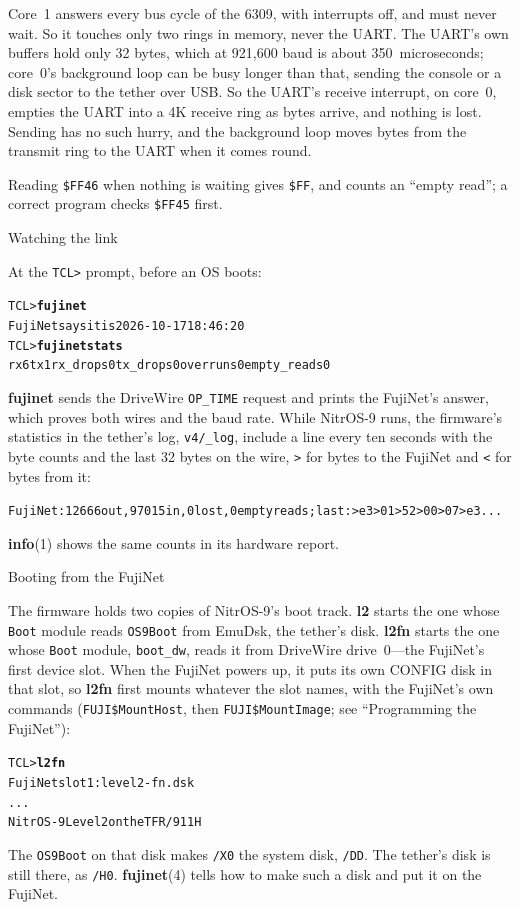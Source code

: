 \documentclass[10pt,twoside,openany]{book}
\makeatletter
\newcommand{\cmd}[1]{\textbf{#1}}            %
\newcommand{\file}[1]{\texttt{#1}}           %
\newcommand{\rp}[2]{\textbf{#1}(#2)}         %
\newenvironment{ex}{\par\vspace{0.3ex}\small\begin{alltt}}{\end{alltt}\vspace{0.3ex}}
\newenvironment{exsmall}{\par\vspace{0.3ex}\scriptsize\begin{alltt}}{\end{alltt}\vspace{0.3ex}}
\renewcommand{\subsection}{\@startsection{subsection}{2}{0pt}{2.4ex plus 0.6ex}{0.8ex}%
  {\sffamily\bfseries\normalsize}}
\makeatother
\begin{document}
Core~1 answers every bus cycle of the 6309, with interrupts off, and must
never wait. So it touches only two rings in memory, never the UART. The
UART's own buffers hold only 32 bytes, which at 921{,}600 baud is about
350~microseconds; core~0's background loop can be busy longer than that,
sending the console or a disk sector to the tether over USB. So the UART's
receive interrupt, on core~0, empties the UART into a 4K receive ring as
bytes arrive, and nothing is lost. Sending has no such hurry, and the
background loop moves bytes from the transmit ring to the UART when it
comes round.

Reading \file{\$FF46} when nothing is waiting gives \file{\$FF}, and
counts an ``empty read''; a correct program checks \file{\$FF45} first.

\subsection{Watching the link}

At the \texttt{TCL>} prompt, before an OS boots:
\begin{ex}
TCL> \textbf{fujinet}
FujiNet says it is 2026-10-17 18:46:20
TCL> \textbf{fujinet stats}
rx 6 tx 1 rx_drops 0 tx_drops 0 overruns 0 empty_reads 0
\end{ex}
\cmd{fujinet} sends the DriveWire \texttt{OP\_TIME} request and prints the
FujiNet's answer, which proves both wires and the baud rate. While NitrOS-9
runs, the firmware's statistics in the tether's log, \file{v4/\_log},
include a line every ten seconds with the byte counts and the last 32
bytes on the wire, \texttt{>} for bytes to the FujiNet and \texttt{<}
for bytes from it:
\begin{exsmall}
FujiNet: 12666 out, 97015 in, 0 lost, 0 empty reads; last: >e3 >01 >52 >00 >07 >e3 ...
\end{exsmall}
\rp{info}{1} shows the same counts in its hardware report.

\subsection{Booting from the FujiNet}

The firmware holds two copies of NitrOS-9's boot track. \cmd{l2} starts the
one whose \file{Boot} module reads \file{OS9Boot} from EmuDsk, the
tether's disk. \cmd{l2fn} starts the one whose \file{Boot} module,
\file{boot\_dw}, reads it from DriveWire drive~0---the FujiNet's first
device slot. When the FujiNet powers up, it puts its own CONFIG disk in
that slot, so \cmd{l2fn} first mounts whatever the slot names, with the
FujiNet's own commands (\texttt{FUJI\$MountHost}, then
\texttt{FUJI\$MountImage}; see ``Programming the FujiNet''):
\begin{ex}
TCL> \textbf{l2fn}
FujiNet slot 1: level2-fn.dsk
...
NitrOS-9 Level 2 on the TFR/911H
\end{ex}
The \file{OS9Boot} on that disk makes \file{/X0} the system disk,
\file{/DD}. The tether's disk is still there, as \file{/H0}.
\rp{fujinet}{4} tells how to make such a disk and put it on the FujiNet.
\end{document}
